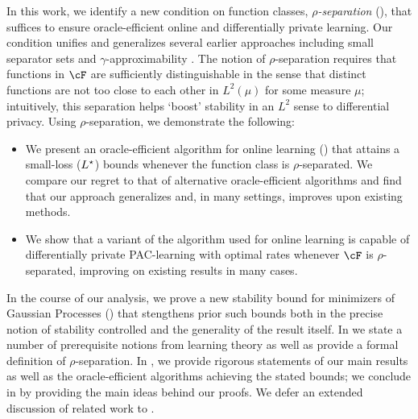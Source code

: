 In this work, we identify a new condition on function classes, $\rho$\emph{-separation} (), that suffices to ensure oracle-efficient online and differentially private learning.  Our condition unifies and generalizes several earlier approaches including small separator sets \cite{dudik2020oracle,syrgkanis2016efficient} and $\gamma$-approximability \citep{wang2022adaptive}.  The notion of $\rho$-separation requires that functions in $\cF$ are sufficiently distinguishable in the sense that distinct functions are not too close to each other in $L^2(\mu)$ for some measure $\mu$; intuitively, this separation helps `boost' stability in an $L^2$ sense to differential privacy.  Using $\rho$-separation, we demonstrate the following:
\begin{itemize}
    \item We present an oracle-efficient algorithm for online learning () that attains a small-loss ($L^\star$) bounds whenever the function class is $\rho$-separated.  We compare our regret to that of alternative oracle-efficient algorithms and find that our approach generalizes and, in many settings, improves upon existing methods.
    \item We show that a variant of the algorithm used for online learning is capable of differentially private PAC-learning with optimal rates whenever $\cF$ is $\rho$-separated, improving on existing results in many cases.
\end{itemize}
In the course of our analysis, we prove a new stability bound for minimizers of Gaussian Processes () that stengthens prior such bounds both in the precise notion of stability controlled and the generality of the result itself.  In  we state a number of prerequisite notions from learning theory as well as provide a formal definition of $\rho$-separation.  In , we provide rigorous statements of our main results as well as the oracle-efficient algorithms achieving the stated bounds; we conclude in  by providing the main ideas behind our proofs.  We defer an extended discussion of related work to .













































